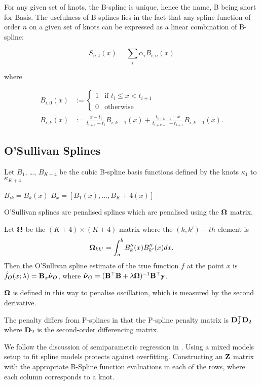 \documentclass{amsart}[12pt]
\begin{document}
For any given set of knots, the B-spline is unique, hence the name, B being short for Basis. The usefulness
of B-splines lies in the fact that any spline function of order $n$ on a given set of knots can be expressed
as a linear combination of B-spline:

$$
S_{n, t}(x) = \sum_i \alpha_i B_{i, n}(x)
$$

where

\begin{align*}
B_{i, 0}(x) &:= \begin{cases}
1 & \text{if } t_i \leq x < t_{i+1} \\
0 & \text{otherwise}
\end{cases} \\
B_{i, k}(x) &:= \frac{x - t_i}{t_{i + 1} - t_i} B_{i, k-1} (x) + \frac{t_{i + k + 1} - x}{t_{i + k + 1} - t_{i + 1}} B_{i, k-1} (x).
\end{align*}

\subsection{O'Sullivan Splines}

Let $B_1$, \ldots, $B_{K+4}$ be the cubic B-spline basis functions defined by the knots $\kappa_1$ to
$\kappa_{K+4}$

$B_{ik} = B_k (x)$
$B_x = [B_1(x), \ldots, B_K+4(x)]$

O'Sullivan splines are penalised splines which are penalised using the ${\boldsymbol \Omega}$ matrix.

Let ${\boldsymbol \Omega}$ be the $(K+4) \times (K+4)$ matrix where the $(k, k')-th$ element is
\[
	{\boldsymbol \Omega}_{k k'} = \int_a^b B''_k(x) B''_{k'}(x) dx.
\]
Then the O'Sullivan spline estimate of the true function $f$ at the point $x$ is
$\hat{f}_O(x; \lambda) = {\bf B}_x \hat{{\boldsymbol \nu}}_O$, where
$\hat{{\boldsymbol \nu}}_O = ({\bf B}^\top {\bf B} + \lambda {\boldsymbol\Omega})^{-1} {\bf B}^\top {\bf y}$.

${\boldsymbol \Omega}$ is defined in this way to penalise oscillation, which is measured by the second derivative.

The penalty differs from P-splines in that the P-spline penalty matrix is ${\bf D}_2^\top {\bf D}_2$ where ${\bf D}_2$ is
the second-order differencing matrix.

We follow the discussion of semiparametric regression in \cite{RuppertWandCarroll}.
Using a mixed models setup to fit spline models protects against overfitting.
Constructing an ${\bf Z}$ matrix with the appropriate B-Spline function evaluations in each of the rows, where
each column corresponds to a knot.
\end{document}
